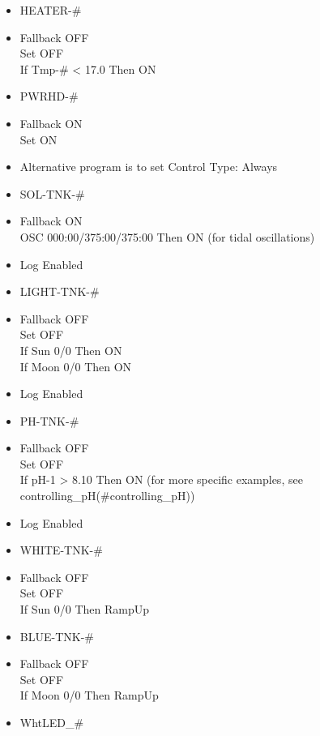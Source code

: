 \documentclass[]{book}
\providecommand{\tightlist}{%
  \setlength{\itemsep}{0pt}\setlength{\parskip}{0pt}}
\begin{document}
\begin{itemize}
\tightlist
\item
  HEATER-\#
\item
  Fallback OFF\\
  Set OFF\\
  If Tmp-\# \textless{} 17.0 Then ON\\
\item
  PWRHD-\#
\item
  Fallback ON\\
  Set ON\\
\item
  Alternative program is to set Control Type: Always\\
\item
  SOL-TNK-\#
\item
  Fallback ON\\
  OSC 000:00/375:00/375:00 Then ON (for tidal oscillations)\\
\item
  Log Enabled\\
\item
  LIGHT-TNK-\#
\item
  Fallback OFF\\
  Set OFF\\
  If Sun 0/0 Then ON\\
  If Moon 0/0 Then ON\\
\item
  Log Enabled\\
\item
  PH-TNK-\#
\item
  Fallback OFF\\
  Set OFF\\
  If pH-1 \textgreater{} 8.10 Then ON (for more specific examples, see
  controlling\_pH(\#controlling\_pH))\\
\item
  Log Enabled\\
\item
  WHITE-TNK-\#
\item
  Fallback OFF\\
  Set OFF\\
  If Sun 0/0 Then RampUp\\
\item
  BLUE-TNK-\#
\item
  Fallback OFF\\
  Set OFF\\
  If Moon 0/0 Then RampUp\\
\item
  WhtLED\_\#

\end{itemize}
\end{document}
